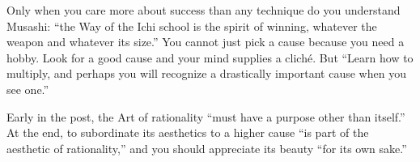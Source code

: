 Only when you care more about success than any technique do you understand Musashi: ``the Way of the Ichi school is the spirit of winning, whatever the weapon and whatever its size.'' You cannot just pick a cause because you need a hobby. Look for a good cause and your mind supplies a cliché. But ``Learn how to multiply, and perhaps you will recognize a drastically important cause when you see one.''

Early in the post, the Art of rationality ``must have a purpose other than itself.'' At the end, to subordinate its aesthetics to a higher cause ``is part of the aesthetic of rationality,'' and you should appreciate its beauty ``for its own sake.''
